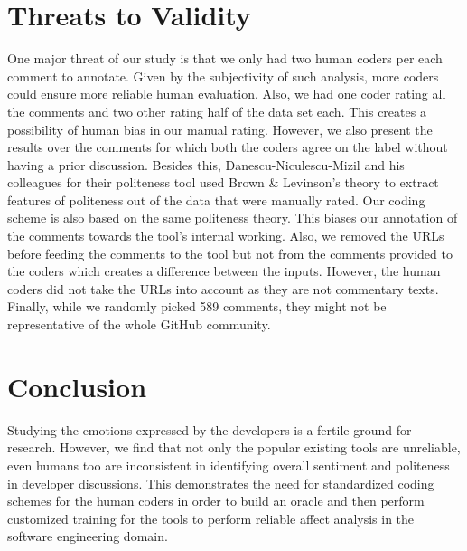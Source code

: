 \section{Threats to Validity}
One major threat of our study is 
that we only had two human coders 
per each comment to annotate. 
Given by the subjectivity of such analysis, 
more coders could ensure more reliable human evaluation.
Also, we had one coder rating all the comments 
and two other rating half of the data set each.
This creates a possibility of human bias 
in our manual rating.
However, we also present the results over the comments 
for which both the coders agree on the label 
without having a prior discussion.
Besides this, Danescu-Niculescu-Mizil and his colleagues 
for their politeness tool used Brown \& Levinson's theory 
to extract features of politeness out of the data 
that were manually rated. 
Our coding scheme is also based on the same politeness theory. 
This biases our annotation of the comments 
towards the tool's internal working. 
Also, 
we removed the URLs 
before feeding the comments to the tool 
but 
not from the comments provided to the coders 
which creates a difference between the inputs.
However, 
the human coders did not take the URLs into account 
as they are not commentary texts.
Finally, while we randomly picked 589 comments, they might not be representative of the whole GitHub community.

\section{Conclusion}
Studying the emotions expressed by the developers
is a fertile ground for research. 
However, we find that 
not only the popular existing tools are unreliable,
even humans too are inconsistent  
in identifying overall sentiment and politeness 
in developer discussions.
This demonstrates the need for 
standardized coding schemes 
for the human coders
in order to build an oracle
and then perform customized training 
for the tools
to perform reliable affect analysis
in the software engineering domain. 







